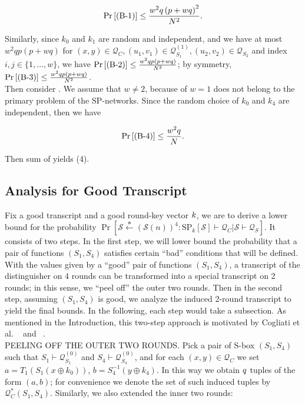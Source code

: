 $$
\operatorname{Pr}\left[\text{(B-1)}\right] \leq \frac{w^{2} q \left(p+w q\right)^{2}}{N^{2}}.
$$

Similarly, since $k_{0}$ and $k_{1}$ are random and independent, and we have at most $w^{2} q p \left(p+w q\right)$ for $(x, y) \in \mathcal{Q}_{C}, \left(u_{1}, v_{1}\right) \in \mathcal{Q}_{S_{1}}^{(1)}, \left(u_{2}, v_{2}\right) \in \mathcal{Q}_{S_{2}}$ and index $i, j \in \{1, \ldots, w\}$, we have $\operatorname{Pr}\left[\text{(B-2)}\right] \leq \frac{w^{2} q p \left(p+w q\right)}{N^{2}}$; by symmetry, $\operatorname{Pr}\left[\text{(B-3)}\right] \leq \frac{w^{2} q p \left(p+w q\right)}{N^{2}}$. \\

\noindent Then consider \bfour. We assume that $w \neq 2$, because of $w = 1$ does not belong to the primary problem of the SP-networks. Since the random choice of $k_{0}$ and $k_{4}$ are independent, then we have

$$
\operatorname{Pr}\left[\text{(B-4)}\right] \leq \frac{w^{2} q}{N}.
$$

\noindent  Then sum of yields (4).

\subsection{Analysis for Good Transcript}

\noindent Fix a good transcript and a good round-key vector $\mathnormal{k}$, we are to derive a lower bound for the probability  $\operatorname{Pr}\left[\mathcal{S} \stackrel{\mathbf{s}}{\leftarrow}(\mathcal{S}(n))^{4}: \mathrm{SP}_{k}[\mathcal{S}] \vdash \mathcal{Q}_{C} | \mathcal{S} \vdash \mathcal{Q}_{S}\right]$. It consists of two steps. In the first step, we will lower bound the probability that a pair of functions $(S_{1}, S_{4})$  satisfies certain ``bad'' conditions that will be defined. With the values given by a ``good'' pair of functions $(S_{1}, S_{4})$, a transcript of the distinguisher on 4 rounds can be transformed into a special transcript on 2 rounds; in this sense, we ``peel off'' the outer two rounds. Then in the second step, assuming $(S_{1}, S_{4})$ is good, we analyze the induced 2-round transcript to yield the final bounds. In the following, each step would take a subsection. As mentioned in the Introduction, this two-step approach is motivated by Cogliati et al.
~\cite{cogliati2015tweaking} and ~\cite{cogliati2015beyond}.\\

\noindent
\textsc{PEELING OFF THE OUTER TWO ROUNDS}. Pick a pair of S-box $(S_1, S_4)$ such that $S_{1} \vdash \mathcal{Q}_{S_{1}}^{(0)}$ and $S_{4} \vdash \mathcal{Q}_{S_{4}}^{(0)}$, and for each $ (x, y) \in \mathcal{Q}_{C}$ we set $a=T_{1}\left(S_{1}\left(x \oplus k_{0}\right)\right)$, $b=S_{4}^{-1}\left(y \oplus k_{4}\right)$. In this way we obtain $\mathnormal{q}$ tuples of the form $(a,b)$; for convenience we denote the set of such induced tuples by $\mathcal{Q}_{C}^{*}\left(S_{1}, S_{4}\right)$. Similarly, we also extended the inner two rounds:\\

